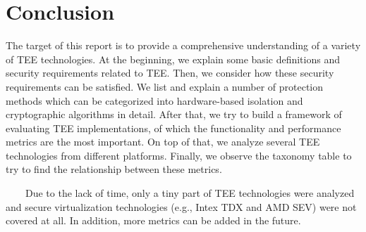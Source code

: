 \documentclass[12pt,twoside]{report}
\begin{document}
\begin{table}[]
\begin{tabular}{|l|cccccc|cccccccc|}
\end{tabular}
\end{table}


\chapter{Conclusion}
The target of this report is to provide a comprehensive understanding of a variety of TEE technologies. At the beginning, we explain some basic definitions and security requirements related to TEE. Then, we consider how these security requirements can be satisfied. We list and explain a number of protection methods which can be categorized into hardware-based isolation and cryptographic algorithms in detail. After that, we try to build a framework of evaluating TEE implementations, of which the functionality and performance metrics are the most important. On top of that, we analyze several TEE technologies from different platforms. Finally, we observe the taxonomy table to try to find the relationship between these metrics.

\ \ \ \ Due to the lack of time, only a tiny part of TEE technologies were analyzed and secure virtualization technologies (e.g., Intex TDX and AMD SEV) were not covered at all. In addition, more metrics can be added in the future.

%

\printbibliography[title={References}]
\end{document}
